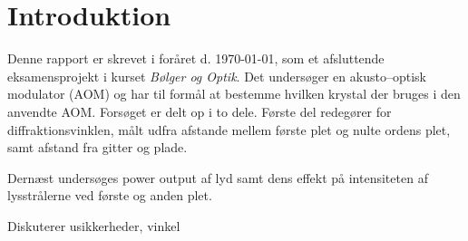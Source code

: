 \documentclass[main]{subfiles}
\begin{document}
\section{Introduktion}
Denne rapport er skrevet i foråret d. \today, som et afsluttende eksamensprojekt i kurset \emph{Bølger og Optik}. Det undersøger en akusto--optisk modulator (AOM) og har til formål at bestemme hvilken krystal der bruges i den anvendte AOM.
Forsøget er delt op i to dele. Første del redegører for diffraktionsvinklen,
målt udfra afstande mellem første plet og nulte ordens plet, samt afstand fra
gitter og plade.

Dernæst undersøges power output af lyd samt dens effekt på intensiteten af
lysstrålerne ved første og anden plet.

Diskuterer usikkerheder, vinkel
\end{document}
